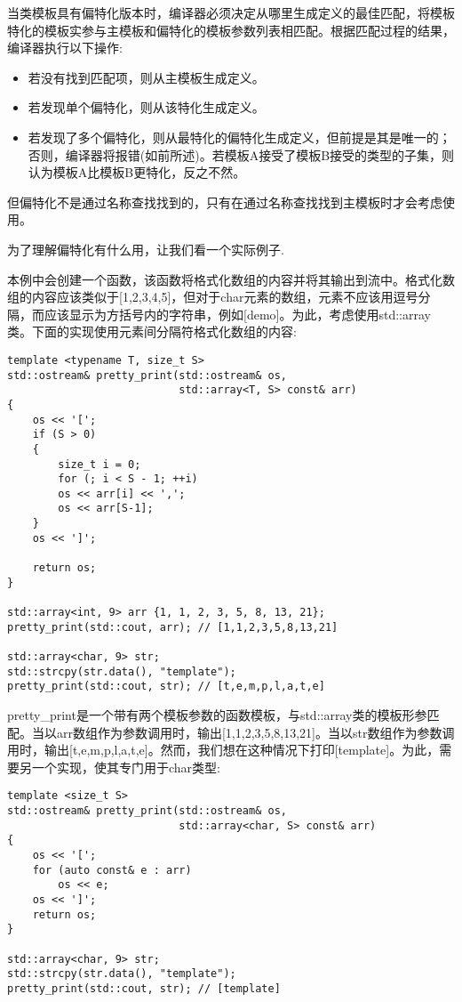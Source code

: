 当类模板具有偏特化版本时，编译器必须决定从哪里生成定义的最佳匹配，将模板特化的模板实参与主模板和偏特化的模板参数列表相匹配。根据匹配过程的结果，编译器执行以下操作:

\begin{itemize}
\item 
若没有找到匹配项，则从主模板生成定义。

\item 
若发现单个偏特化，则从该特化生成定义。

\item 
若发现了多个偏特化，则从最特化的偏特化生成定义，但前提是其是唯一的；否则，编译器将报错(如前所述)。若模板A接受了模板B接受的类型的子集，则认为模板A比模板B更特化，反之不然。
\end{itemize}

但偏特化不是通过名称查找找到的，只有在通过名称查找找到主模板时才会考虑使用。

为了理解偏特化有什么用，让我们看一个实际例子.

本例中会创建一个函数，该函数将格式化数组的内容并将其输出到流中。格式化数组的内容应该类似于[1,2,3,4,5]，但对于char元素的数组，元素不应该用逗号分隔，而应该显示为方括号内的字符串，例如[demo]。为此，考虑使用std::array类。下面的实现使用元素间分隔符格式化数组的内容:

\begin{lstlisting}[style=styleCXX]
template <typename T, size_t S>
std::ostream& pretty_print(std::ostream& os,
                           std::array<T, S> const& arr)
{
	os << '[';
	if (S > 0)
	{
		size_t i = 0;
		for (; i < S - 1; ++i)
		os << arr[i] << ',';
		os << arr[S-1];
	}
	os << ']';
	
	return os;
}

std::array<int, 9> arr {1, 1, 2, 3, 5, 8, 13, 21};
pretty_print(std::cout, arr); // [1,1,2,3,5,8,13,21]

std::array<char, 9> str;
std::strcpy(str.data(), "template");
pretty_print(std::cout, str); // [t,e,m,p,l,a,t,e]
\end{lstlisting}

pretty\_print是一个带有两个模板参数的函数模板，与std::array类的模板形参匹配。当以arr数组作为参数调用时，输出[1,1,2,3,5,8,13,21]。当以str数组作为参数调用时，输出[t,e,m,p,l,a,t,e]。然而，我们想在这种情况下打印[template]。为此，需要另一个实现，使其专门用于char类型:

\begin{lstlisting}[style=styleCXX]
template <size_t S>
std::ostream& pretty_print(std::ostream& os,
						   std::array<char, S> const& arr)
{
	os << '[';
	for (auto const& e : arr)
		os << e;
	os << ']';
	return os;
}

std::array<char, 9> str;
std::strcpy(str.data(), "template");
pretty_print(std::cout, str); // [template]
\end{lstlisting}

